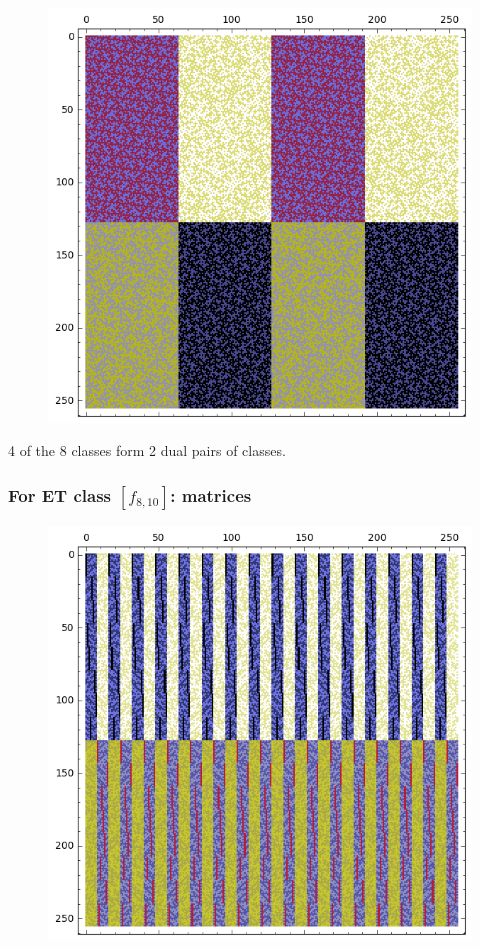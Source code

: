 \documentclass[pdf,sprung,slideColor,nocolorBG]{beamer}
\newenvironment{colortheme}[1]{
\def\ProvidesPackageRCS $##1${\relax}
\renewcommand{\ProcessOptions}{\relax}
\makeatletter

\makeatother
}{}
\begin{document}
\begin{colortheme}{jubata}
\begin{frame}
\begin{figure}
\begin{minipage}{.48\textwidth}
  \label{fig:c8_9_bent_cayley_graph_index_matrix}
\end{minipage}
\begin{minipage}{.48\textwidth}
  \centering
  \includegraphics[width=.9\linewidth]{../matrix_plot/re8_9_dual_cayley_graph_index_matrix.png}
  \label{fig:c8_9_dual_cayley_graph_index_matrix}
\end{minipage}%
\end{figure}
4 of the 8 classes form 2 dual pairs of classes.
\end{frame}
\begin{frame}
\frametitle{For ET class $[f_{8,10}]$: matrices}
\begin{figure}
\centering
\begin{minipage}{.48\textwidth}
  \centering
  \includegraphics[width=.9\linewidth]{../matrix_plot/re8_10_bent_cayley_graph_index_matrix.png}

\end{minipage}
\end{figure}
\end{frame}
\end{colortheme}
\end{document}
